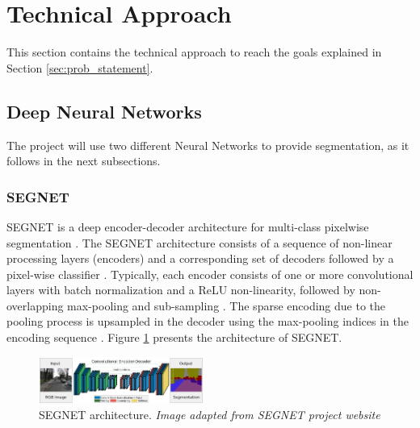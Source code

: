 \documentclass[10pt,twocolumn,letterpaper]{article}
\begin{document}
\section{Technical Approach} \label{sec:tech_approach}


This section contains the technical approach to reach the goals explained in Section \ref{sec:prob_statement}.

\subsection{Deep Neural Networks} \label{ssec:neura_nets}

The project will use two different Neural Networks to provide segmentation, as it follows in the next subsections.

\subsubsection{SEGNET} \label{sssec:segnet}

SEGNET is a deep encoder-decoder architecture for multi-class pixelwise segmentation \cite{SEGNET}. The SEGNET architecture consists of a sequence of non-linear processing layers (encoders) and a corresponding set of decoders followed by a pixel-wise classifier \cite{SEGNET} \cite{SEGNET_WEBSITE}. Typically, each encoder consists of one or more convolutional layers with batch normalization and a ReLU non-linearity, followed by non-overlapping max-pooling and sub-sampling \cite{SEGNET} \cite{SEGNET_WEBSITE}. The sparse encoding due to the pooling process is upsampled in the decoder using the max-pooling indices in the encoding sequence \cite{SEGNET} \cite{SEGNET_WEBSITE}. Figure \ref{fig:segnet} presents the architecture of SEGNET.

\begin{figure}[ht]
  \centering
  \includegraphics[width=0.48\textwidth]{segnet.png}
  \caption{SEGNET architecture. \textit{Image adapted from SEGNET project website} \cite{SEGNET_WEBSITE} \cite{SEGNET}}
  \label{fig:segnet}
\end{figure}
\end{document}

